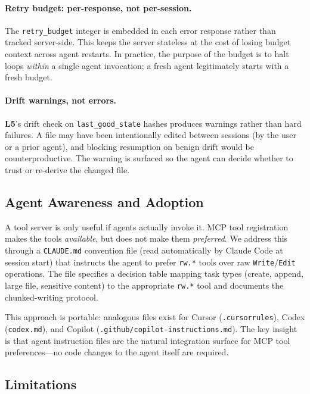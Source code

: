 \documentclass[11pt,twocolumn]{article}
\newcommand{\layer}[1]{\textbf{L#1}}
\begin{document}
\paragraph{Retry budget: per-response, not per-session.}
The \texttt{retry\_budget} integer is embedded in each error
response rather than tracked server-side.  This keeps the server
stateless at the cost of losing budget context across agent
restarts.  In practice, the purpose of the budget is to halt
loops \emph{within} a single agent invocation; a fresh agent
legitimately starts with a fresh budget.

\paragraph{Drift warnings, not errors.}
\layer{5}'s drift check on \texttt{last\_good\_state} hashes
produces warnings rather than hard failures.  A file may have been
intentionally edited between sessions (by the user or a prior
agent), and blocking resumption on benign drift would be
counterproductive.  The warning is surfaced so the agent can
decide whether to trust or re-derive the changed file.

\subsection{Agent Awareness and Adoption}
\label{sec:awareness}

A tool server is only useful if agents actually invoke it. MCP
tool registration makes the tools \emph{available}, but does not
make them \emph{preferred}. We address this through a
\texttt{CLAUDE.md} convention file (read automatically by Claude
Code at session start) that instructs the agent to prefer
\texttt{rw.*} tools over raw \texttt{Write}/\texttt{Edit}
operations. The file specifies a decision table mapping task types
(create, append, large file, sensitive content) to the
appropriate \texttt{rw.*} tool and documents the chunked-writing
protocol.

This approach is portable: analogous files exist for Cursor
(\texttt{.cursorrules}), Codex (\texttt{codex.md}), and Copilot
(\texttt{.github/copilot-instructions.md}). The key insight is
that agent instruction files are the natural integration surface
for MCP tool preferences---no code changes to the agent itself
are required.

\subsection{Limitations}
\end{document}
